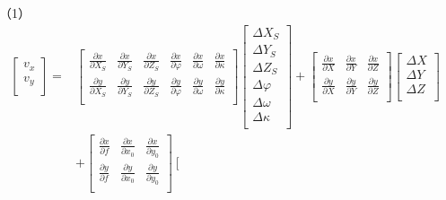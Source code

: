 \documentclass[a4paper]{ctexart}
\newtheorem*{sol}{\hskip 2em 解}
\begin{document}
\begin{sol}
（1）\begin{align*}
\left[ \begin{array}{c}
	v_x\\
	v_y\\
\end{array} \right] =&\left[ \begin{matrix}
	\frac{\partial x}{\partial X_S}&		\frac{\partial x}{\partial Y_S}&		\frac{\partial x}{\partial Z_S}&		\frac{\partial x}{\partial \varphi}&		\frac{\partial x}{\partial \omega}&		\frac{\partial x}{\partial \kappa}\\
	\frac{\partial y}{\partial X_S}&		\frac{\partial y}{\partial Y_S}&		\frac{\partial y}{\partial Z_S}&		\frac{\partial y}{\partial \varphi}&		\frac{\partial y}{\partial \omega}&		\frac{\partial y}{\partial \kappa}\\
\end{matrix} \right] \left[ \begin{array}{c}
	\Delta X_S\\
	\Delta Y_S\\
	\Delta Z_S\\
	\Delta \varphi\\
	\Delta \omega\\
	\Delta \kappa\\
\end{array} \right] +\left[ \begin{matrix}
	\frac{\partial x}{\partial X}&		\frac{\partial x}{\partial Y}&		\frac{\partial x}{\partial Z}\\
	\frac{\partial y}{\partial X}&		\frac{\partial y}{\partial Y}&		\frac{\partial y}{\partial Z}\\
\end{matrix} \right] \left[ \begin{array}{c}
	\Delta X\\
	\Delta Y\\
	\Delta Z\\
\end{array} \right] \\
&+\left[ \begin{matrix}
	\frac{\partial x}{\partial f}&		\frac{\partial x}{\partial x_0}&		\frac{\partial x}{\partial y_0}\\
	\frac{\partial y}{\partial f}&		\frac{\partial y}{\partial x_0}&		\frac{\partial y}{\partial y_0}\\
\end{matrix} \right] \left[ \begin{array}{c}

\end{array}
\end{align*}
\end{sol}
\end{document}
